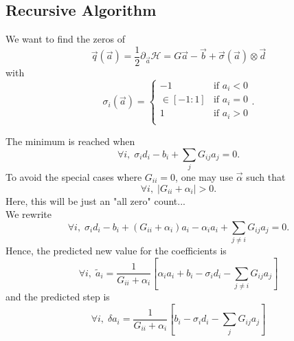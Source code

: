 \documentclass{revtex4}
\begin{document}
\subsection{Recursive Algorithm}

We want to find the zeros of
\begin{equation}
	\vec{q}\left(\vec{a}\right) = \dfrac{1}{2} \partial_{\vec{a}} \mathcal{H} = G\vec{a} - \vec{b} + \vec{\sigma}\left(\vec{a}\right)\otimes\vec{d}
\end{equation}
with
\begin{equation}
	\sigma_{i}\left({\vec{a}}\right) = \left\lbrace
	\begin{array}{rl}
	-1 & \text{if $a_i<0$}\\
	\in[-1:1]  & \text{if $a_i=0$}\\
	1  & \text{if $a_i>0$}\\
	\end{array}
	\right.
	.
\end{equation}

The minimum is reached when
\begin{equation}
	\forall i, \; \sigma_i d_i - b _i + \sum_{j}G_{ij} a_j = 0.
\end{equation}
To avoid the special cases where $G_{ii}=0$, one may use $\vec{\alpha}$ such that
\begin{equation}
	\forall i, \; \vert G_{ii}+\alpha_i \vert > 0.
\end{equation}
Here, this will be just an "all zero" count...\\
We rewrite
\begin{equation}
	\forall i, \; \sigma_i d_i - b _i + \left(G_{ii}+\alpha_i\right)a_i - \alpha_i a_i + \sum_{j\not=i}G_{ij} a_j = 0.
\end{equation}
Hence, the predicted new value for the coefficients is
\begin{equation}
	\forall i,\; \tilde{a}_i = \dfrac{1}{G_{ii}+\alpha_i}
	 \left\lbrack
	 	\alpha_i a_i + b_i - \sigma_i d_i - \sum_{j\not=i}G_{ij} a_j 
	 \right\rbrack
\end{equation}
and the predicted step is
\begin{equation}
	\forall i, \; \delta a_i =  \dfrac{1}{G_{ii}+\alpha_i}
	 \left\lbrack
	 b_i - \sigma_i d_i - \sum_{j}G_{ij} a_j 
	\right\rbrack
\end{equation}
\end{document}

